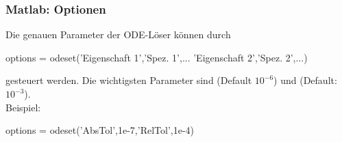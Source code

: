 \documentclass[hyperref={xetex}]{beamer}
\begin{document}
\begin{frame}[fragile]\frametitle{Matlab: Optionen}
Die genauen Parameter der ODE-L\"oser k\"onnen durch\\

\begin{matlabin}
options = odeset('Eigenschaft 1','Spez. 1',...
  'Eigenschaft 2','Spez. 2',...) 
\end{matlabin}

gesteuert werden. Die wichtigsten Parameter sind 
(Default $10^{-6}$) und  (Default: $10^{-3}$). \\[0.5cm]
\alert{Beispiel:}
\begin{matlabin}
options = odeset('AbsTol',1e-7,'RelTol',1e-4)
\end{matlabin}
\end{frame}
%
%

\end{document}

